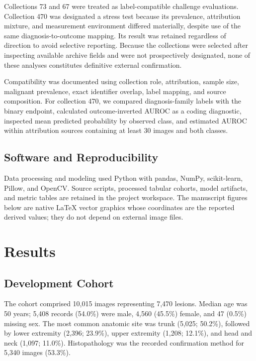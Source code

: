 \documentclass[11pt]{article}
\begin{document}
Collections 73 and 67 were treated as label-compatible challenge evaluations. Collection 470 was designated a stress test because its prevalence, attribution mixture, and measurement environment differed materially, despite use of the same diagnosis-to-outcome mapping. Its result was retained regardless of direction to avoid selective reporting. Because the collections were selected after inspecting available archive fields and were not prospectively designated, none of these analyses constitutes definitive external confirmation.

Compatibility was documented using collection role, attribution, sample size, malignant prevalence, exact identifier overlap, label mapping, and source composition. For collection 470, we compared diagnosis-family labels with the binary endpoint, calculated outcome-inverted AUROC as a coding diagnostic, inspected mean predicted probability by observed class, and estimated AUROC within attribution sources containing at least 30 images and both classes.

\subsection{Software and Reproducibility}
Data processing and modeling used Python with pandas, NumPy, scikit-learn, Pillow, and OpenCV. Source scripts, processed tabular cohorts, model artifacts, and metric tables are retained in the project workspace. The manuscript figures below are native \LaTeX{} vector graphics whose coordinates are the reported derived values; they do not depend on external image files.

\section{Results}
\subsection{Development Cohort}
The cohort comprised 10,015 images representing 7,470 lesions. Median age was 50 years; 5,408 records (54.0\%) were male, 4,560 (45.5\%) female, and 47 (0.5\%) missing sex. The most common anatomic site was trunk (5,025; 50.2\%), followed by lower extremity (2,396; 23.9\%), upper extremity (1,208; 12.1\%), and head and neck (1,097; 11.0\%). Histopathology was the recorded confirmation method for 5,340 images (53.3\%).
\end{document}
